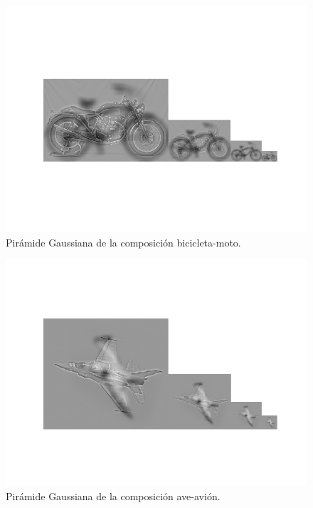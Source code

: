 \documentclass[11pt,a4paper]{article}
\begin{document}
\begin{figure}[H]
\centering
\includegraphics[scale=0.7]{img/hyb-pyr3.png}
\caption{Pirámide Gaussiana de la composición bicicleta-moto.}
\label{fig:hyb-pyr4}
\end{figure}

\begin{figure}[H]
\centering
\includegraphics[scale=0.7]{img/hyb-pyr4.png}
\caption{Pirámide Gaussiana de la composición ave-avión.}
\label{fig:hyb-pyr4}
\end{figure}
\end{document}
